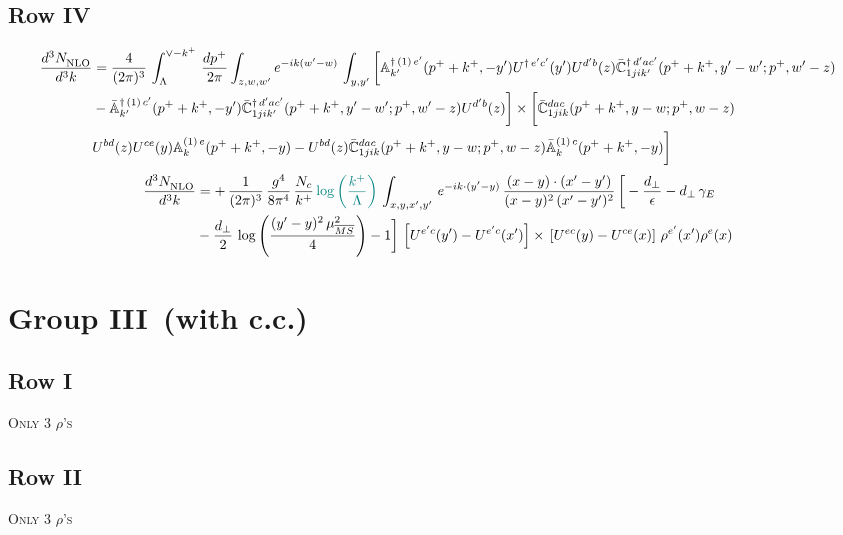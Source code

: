 \documentclass[9pt]{article}
\def\mf#1{\mathbb{#1}}
\numberwithin{equation}{section}
\begin{document}
\subsection{Row IV}
\begin{align}
    \frac{d^{3}N_{\rm NLO}^{\rm}}{d^{3}k}  & = \frac{4}{(2\pi)^{3}}\,\int_{\Lambda}^{\vee-k^{+}}\, \frac{dp^{+}}{2\pi}\int_{z,w,w^{\prime}} e^{-ik(w^{\prime}-w)}\,  \int_{y,y^{\prime}}\bigg[\mf{A}^{\dagger\, (1)\,e^{\prime}}_{k^{\prime}}(p^{+}+k^{+},-y^{\prime})U^{\dagger\, e^{\prime}c^{\prime}}(y^{\prime})U^{d^{\prime}b}(z) \Bar{\mf{C}}^{\dagger\, d^{\prime}ac^{\prime}}_{1jik^{\prime}}(p^{+}+k^{+},y^{\prime}-w^{\prime}; p^{+},w^{\prime}-z) \notag \\ &  -\Bar{\mf{A}}^{\dagger\, (1)\,c^{\prime}}_{k^{\prime}}(p^{+}+k^{+},-y^{\prime}) \Bar{\mf{C}}^{\dagger\, d^{\prime}ac^{\prime}}_{1jik^{\prime}}(p^{+}+k^{+},y^{\prime}-w^{\prime}; p^{+},w^{\prime}-z)U^{d^{\prime}b}(z)\bigg]\times\bigg[\Bar{\mf{C}}^{dac}_{1jik}(p^{+}+k^{+},y-w; p^{+},w-z)\notag \\ & U^{bd}(z)U^{ce}(y) \mf{A}^{(1)\,e}_{k}(p^{+}+k^{+},-y) -U^{bd}(z) \Bar{\mf{C}}^{dac}_{1jik}(p^{+}+k^{+},y-w; p^{+},w-z)\Bar{\mf{A}}^{(1)\,c}_{k}(p^{+}+k^{+},-y)\bigg]\nonumber
\end{align}
\begin{align}
    \frac{d^{3}N_{\rm NLO}^{\rm}}{d^{3}k}  & =  +\,\frac{1}{(2\pi)^{3}}\,\frac{g^{4}}{8\pi^{4}}\, \frac{N_{c}}{k^{+}}\,{\color{teal}\log{\left(\frac{k^{+}}{\Lambda}\right)}}\,\int_{x,y,x',y'}\,e^{-ik\cdot (y'-y)}\,\frac{(x-y)\cdot (x'-y')}{(x-y)^{2}\,(x'-y')^{2}}\,\bigg[-\frac{d_{\perp}}{\epsilon}-d_{\perp}\,\gamma_{E}\notag \\ & -\frac{d_{\perp}}{2}\,\log{\left(\frac{(y'-y)^{2}\,\mu^{2}_{\overline{MS}}}{4}\right)}-1\bigg]\,\left[U^{e'c}(y') - U^{e'c}(x')\right] \times\, \left[U^{ec}(y) - U^{ce}(x)\right]\, \rho^{e'}(x') \rho^{e}(x)
\end{align}
\section{Group III\, (with c.c.)}
\subsection{Row I}
\textsc{Only 3 $\rho$'s}
\subsection{Row II}
\textsc{Only 3 $\rho$'s}
\end{document}
